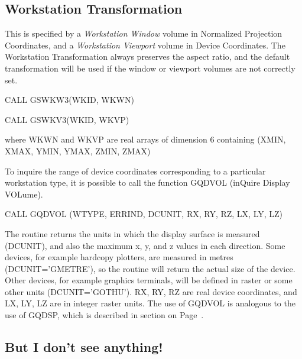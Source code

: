 \subsection{Workstation Transformation}
 
This is specified by a {\it Workstation Window} volume in
Normalized Projection Coordinates, and a {\it Workstation
Viewport} volume in Device Coordinates.
The Workstation Transformation always preserves the aspect ratio,
and the default transformation will be used if the window or viewport
volumes are not correctly set.
\begin{XMP}
CALL GSWKW3(WKID, WKWN)
 
CALL GSWKV3(WKID, WKVP)
\end{XMP}
where WKWN and WKVP are real arrays of dimension 6 containing
(XMIN, XMAX, YMIN, YMAX, ZMIN, ZMAX)
 
To inquire the range of device coordinates corresponding to a particular
workstation type, it is possible to call the function GQDVOL
(inQuire Display VOLume).
\begin{XMP}
CALL GQDVOL (WTYPE, ERRIND, DCUNIT, RX, RY, RZ, LX, LY, LZ)
\end{XMP}
The routine returns the units in which the display surface
is measured (DCUNIT), and also the maximum x, y, and z values
in each direction.
Some devices, for example hardcopy plotters, are measured in metres
(DCUNIT='GMETRE'), so the routine will return the actual size of the
device. Other devices, for example graphics terminals,
will be defined in raster or some other units (DCUNIT='GOTHU').
RX, RY, RZ are real device coordinates,
and LX, LY, LZ are in integer raster units.
The use of GQDVOL is analogous to the use of GQDSP,
which is described in section on Page~\pageref{sec:wstntfm}.
\subsection{But I don't see anything!}
 
